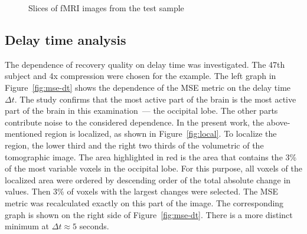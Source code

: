 \documentclass[sn-mathphys-num]{sn-jnl}%
\theoremstyle{thmstyleone}%
\theoremstyle{thmstyletwo}%
\theoremstyle{thmstylethree}%
\begin{document}
\begin{figure}[h!]
	\centering
	\hfill
	\hfill
	\caption{Slices of fMRI images from the test sample}
	\label{fig:example}
\end{figure}

\subsection{Delay time analysis}

The dependence of recovery quality on delay time was investigated.
The 47th subject and 4x compression were chosen for the example.
The left graph in Figure~\ref{fig:mse-dt} shows the dependence of the MSE metric
on the delay time $\Delta t$.
The study confirms that the most active part of the brain is the most active part of the brain 
in this examination~--- the occipital lobe.
The other parts contribute noise to the considered dependence.
In the present work, the above-mentioned region is localized, 
as shown in Figure~\ref{fig:local}.
To localize the region, the lower third and the right two thirds of the volumetric
of the tomographic image.
The area highlighted in red is the area that contains the 3\% 
of the most variable voxels in the occipital lobe.
For this purpose, all voxels of the localized area were ordered by 
descending order of the total absolute change in values.
Then 3\% of voxels with the largest changes were selected.
The MSE metric was recalculated exactly on this part of the image.
The corresponding graph is shown on the right side of Figure~\ref{fig:mse-dt}.
There is a more distinct minimum at $\Delta t \approx 5$ seconds.
\end{document}

